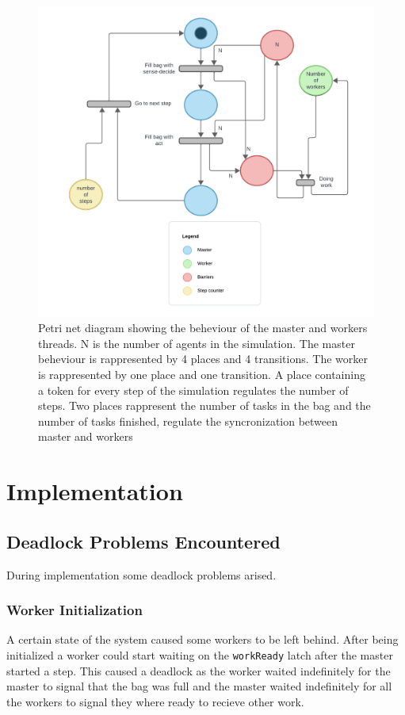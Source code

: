 \documentclass[12pt, a4paper]{report}
\begin{document}
\begin{figure}
    \centering
    \includegraphics{PetriNetColored.png}
    \caption{Petri net diagram showing the beheviour of the master and workers threads. N is the number of agents in the simulation. The master beheviour is rappresented by 4 places and 4 transitions. The worker is rappresented by one place and one transition. A place containing a token for every step of the simulation regulates the number of steps. Two places rappresent the number of tasks in the bag and the number of tasks finished, regulate the syncronization between master and workers}
\end{figure}

\chapter{Implementation}

\section{Deadlock Problems Encountered}
During implementation some deadlock problems arised.

\subsection{Worker Initialization}
A certain state of the system caused some workers to be left behind.
 After being initialized a worker could start waiting on the \texttt{workReady} latch after
 the master started a step. This caused a deadlock as the worker waited indefinitely
 for the master to signal that the bag was full and the master waited indefinitely for
 all the workers to signal they where ready to recieve other work.
\end{document}
